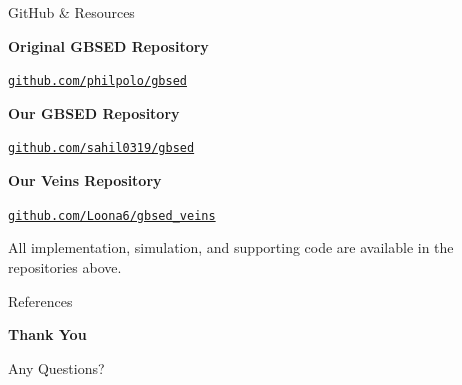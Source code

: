 \documentclass[aspectratio=169]{beamer}
\begin{document}
\begin{frame}{GitHub \& Resources}

\begin{center}

\textbf{\large Original GBSED Repository}

\vspace{0.08cm}

\href{https://github.com/philpolo/gbsed}
{\small \texttt{github.com/philpolo/gbsed}}

\vspace{0.4cm}

\textbf{\large Our GBSED Repository}

\vspace{0.08cm}

\href{https://github.com/sahil0319/gbsed}
{\small \texttt{github.com/sahil0319/gbsed}}

\vspace{0.4cm}

\textbf{\large Our Veins Repository}

\vspace{0.08cm}

\href{https://github.com/Loona6/gbsed_veins}
{\small \texttt{github.com/Loona6/gbsed\_veins}}

\end{center}

\vfill

\begin{center}
\small
All implementation, simulation, and supporting code are available in the repositories above.
\end{center}

\end{frame}







\begin{frame}{References}

\scriptsize

\nocite{malawade2022roadscene2vec}




\end{frame}
\begin{frame}

\begin{center}

\vspace{1.5cm}

{\Huge \textbf{Thank You}}

\vspace{0.5cm}

{\Large Any Questions?}

\vspace{0.8cm}


\end{center}

\end{frame}
\end{document}
